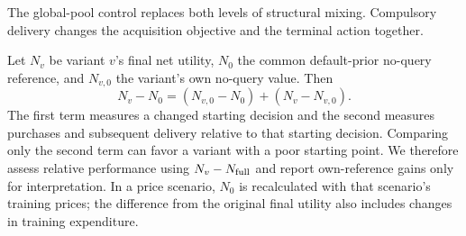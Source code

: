 \documentclass[journal]{IEEEtran}
\begin{document}
The global-pool control replaces both levels of structural mixing. Compulsory delivery changes the acquisition objective and the terminal action together.

Let $N_v$ be variant $v$'s final net utility, $N_0$ the common default-prior no-query reference, and $N_{v,0}$ the variant's own no-query value. Then
\begin{equation}
 N_v-N_0=(N_{v,0}-N_0)+(N_v-N_{v,0}).
\end{equation}
The first term measures a changed starting decision and the second measures purchases and subsequent delivery relative to that starting decision. Comparing only the second term can favor a variant with a poor starting point. We therefore assess relative performance using $N_v-N_{\rm full}$ and report own-reference gains only for interpretation. In a price scenario, $N_0$ is recalculated with that scenario's training prices; the difference from the original final utility also includes changes in training expenditure.
\end{document}
